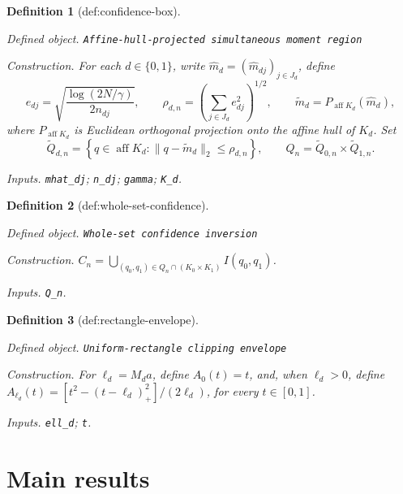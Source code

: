 \documentclass{article}
\newtheorem{definition}{Definition}
\begin{document}
\begin{definition}[def:confidence-box]\label{def:confidence-box}
\par\smallskip\noindent\emph{Defined object.} \texttt{Affine-\allowbreak{}hull-\allowbreak{}projected simultaneous moment region}
\par\smallskip\noindent\emph{Construction.} For each \(d\in\{0,1\}\), write \(\widehat m_d=(\widehat m_{dj})_{j\in J_d}\), define
\[
 e_{dj}=\sqrt{\frac{\log(2N/\gamma)}{2n_{dj}}},\qquad
 \rho_{d,n}=\left(\sum_{j\in J_d}e_{dj}^{2}\right)^{1/2},\qquad
 \widetilde m_d=P_{\operatorname{aff}K_d}(\widehat m_d),
\]
where \(P_{\operatorname{aff}K_d}\) is Euclidean orthogonal projection onto the affine hull of \(K_d\).  Set
\[
 \widetilde Q_{d,n}
 =\left\{q\in\operatorname{aff}K_d:
          \|q-\widetilde m_d\|_2\leq\rho_{d,n}\right\},
 \qquad
 Q_n=\widetilde Q_{0,n}\times\widetilde Q_{1,n}.
\]
\par\smallskip\noindent\emph{Inputs.} \texttt{mhat\_\allowbreak{}dj}; \texttt{n\_\allowbreak{}dj}; \texttt{gamma}; \texttt{K\_\allowbreak{}d}.
\end{definition}

\begin{definition}[def:whole-set-confidence]\label{def:whole-set-confidence}
\par\smallskip\noindent\emph{Defined object.} \texttt{Whole-\allowbreak{}set confidence inversion}
\par\smallskip\noindent\emph{Construction.} \(C_n=\bigcup_{(q_0,q_1)\in Q_n\cap(K_0\times K_1)}I(q_0,q_1)\).
\par\smallskip\noindent\emph{Inputs.} \texttt{Q\_\allowbreak{}n}.
\end{definition}

\begin{definition}[def:rectangle-envelope]\label{def:rectangle-envelope}
\par\smallskip\noindent\emph{Defined object.} \texttt{Uniform-\allowbreak{}rectangle clipping envelope}
\par\smallskip\noindent\emph{Construction.} For \(\ell_d=M_da\), define \(A_0(t)=t\), and, when \(\ell_d>0\), define
\(A_{\ell_d}(t)=[t^2-(t-\ell_d)_+^2]/(2\ell_d)\), for every \(t\in[0,1]\).
\par\smallskip\noindent\emph{Inputs.} \texttt{ell\_\allowbreak{}d}; \texttt{t}.
\end{definition}

\section{Main results}
\end{document}
